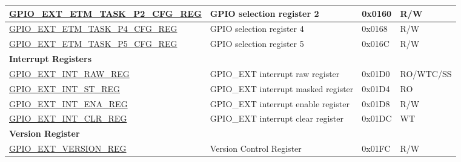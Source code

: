 \begin{longtable}{ | p{5.9cm} | p{6.8cm} | p{1.3cm} | p{1.9cm} | }
\hyperref[regdesc:GPIOEXTETMTASKP2CFGREG]{GPIO\_EXT\_ETM\_TASK\_P2\_CFG\_REG} & GPIO selection register 2 & 0x0160 & R/W \\ \hline
\hyperref[regdesc:GPIOEXTETMTASKP4CFGREG]{GPIO\_EXT\_ETM\_TASK\_P4\_CFG\_REG} & GPIO selection register 4 & 0x0168 & R/W \\ \hline
\hyperref[regdesc:GPIOEXTETMTASKP5CFGREG]{GPIO\_EXT\_ETM\_TASK\_P5\_CFG\_REG} & GPIO selection register 5 & 0x016C & R/W \\ \hline
\multicolumn{4}{|l|}{\textbf{Interrupt Registers}} \\ \hline
\hyperref[regdesc:GPIOEXTINTRAWREG]{GPIO\_EXT\_INT\_RAW\_REG} & GPIO\_EXT interrupt raw register & 0x01D0 & RO/WTC/SS \\ \hline
\hyperref[regdesc:GPIOEXTINTSTREG]{GPIO\_EXT\_INT\_ST\_REG} & GPIO\_EXT interrupt masked register & 0x01D4 & RO \\ \hline
\hyperref[regdesc:GPIOEXTINTENAREG]{GPIO\_EXT\_INT\_ENA\_REG} & GPIO\_EXT interrupt enable register & 0x01D8 & R/W \\ \hline
\hyperref[regdesc:GPIOEXTINTCLRREG]{GPIO\_EXT\_INT\_CLR\_REG} & GPIO\_EXT interrupt clear register & 0x01DC & WT \\ \hline
\multicolumn{4}{|l|}{\textbf{Version Register}} \\ \hline
\hyperref[regdesc:GPIOEXTVERSIONREG]{GPIO\_EXT\_VERSION\_REG} & Version Control Register & 0x01FC & R/W \\ \hline
\end{longtable}
